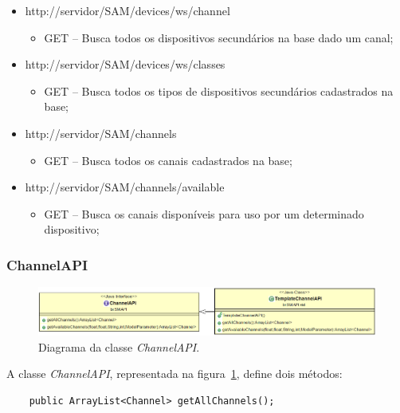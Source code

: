 \begin{itemize}
\begin{itemize}
\end{itemize}
\item http://servidor/SAM/devices/ws/channel
\begin{itemize}
	\item GET -- Busca todos os dispositivos secundários na base dado um canal;
\end{itemize}
\item http://servidor/SAM/devices/ws/classes
\begin{itemize}
	\item GET -- Busca todos os tipos de dispositivos secundários cadastrados na base;
\end{itemize}
\item http://servidor/SAM/channels
\begin{itemize}
	\item GET -- Busca todos os canais cadastrados na base;
\end{itemize}
\item http://servidor/SAM/channels/available
\begin{itemize}
	\item GET -- Busca os canais disponíveis para uso por um determinado dispositivo;
\end{itemize}
\end{itemize}






\subsubsection{ChannelAPI}


\begin{figure}[htb]
\centering
\includegraphics[width=1.0\textwidth]{figs/channelapi}
\caption[\textit{Diagrama da classe \textit{ChannelAPI} }.]
{Diagrama da classe \textit{ChannelAPI}.}
\label{fig:ChannelAPI}
\end{figure} 

A classe \textit{ChannelAPI}, representada na figura~\ref{fig:ChannelAPI}, define dois métodos:

\begin{lstlisting}
	public ArrayList<Channel> getAllChannels();
\end{lstlisting}

